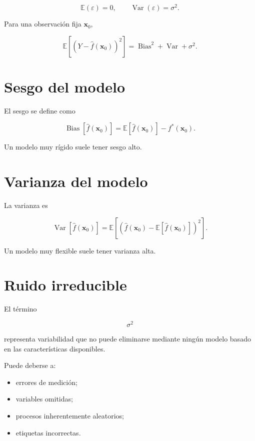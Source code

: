 \documentclass[
  spanish,
  10.5pt,
  letterpaper,
  DIV=11,
  numbers=noendperiod,
  oneside,
  open=any]{scrreprt}
\providecommand{\tightlist}{%
  \setlength{\itemsep}{0pt}\setlength{\parskip}{0pt}}
\theoremstyle{definition}
\theoremstyle{definition}
\theoremstyle{plain}
\theoremstyle{remark}
\begin{document}
\[
\mathbb{E}(\varepsilon)=0,
\qquad
\operatorname{Var}(\varepsilon)=\sigma^2.
\]

Para una observación fija \(\mathbf{x}_0\),

\[
\mathbb{E}
\left[
(
Y-\widehat{f}(\mathbf{x}_0)
)^2
\right]
=
\operatorname{Bias}^2
+
\operatorname{Var}
+
\sigma^2.
\]

\section*{Sesgo del modelo}\label{sesgo-del-modelo}


El sesgo se define como

\[
\operatorname{Bias}
[
\widehat{f}(\mathbf{x}_0)
]
=
\mathbb{E}
[
\widehat{f}(\mathbf{x}_0)
]
-
f^{*}(\mathbf{x}_0).
\]

Un modelo muy rígido suele tener sesgo alto.

\section*{Varianza del modelo}\label{varianza-del-modelo}


La varianza es

\[
\operatorname{Var}
[
\widehat{f}(\mathbf{x}_0)
]
=
\mathbb{E}
\left[
\left(
\widehat{f}(\mathbf{x}_0)
-
\mathbb{E}
[
\widehat{f}(\mathbf{x}_0)
]
\right)^2
\right].
\]

Un modelo muy flexible suele tener varianza alta.

\section*{Ruido irreducible}\label{ruido-irreducible}


El término

\[
\sigma^2
\]

representa variabilidad que no puede eliminarse mediante ningún modelo
basado en las características disponibles.

Puede deberse a:

\begin{itemize}
\tightlist
\item
  errores de medición;
\item
  variables omitidas;
\item
  procesos inherentemente aleatorios;
\item
  etiquetas incorrectas.
\end{itemize}
\end{document}
